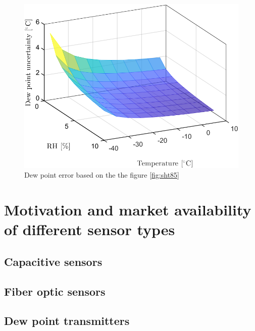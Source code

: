 \begin{figure}[!h]
\centering
\includegraphics[width=0.6\columnwidth]{Chapter6/images/SHTRH15T02.png}
\caption{Dew point error based on the the figure \ref{fig:sht85}}
\label{fig:sht85_dp}
\end{figure}




\section{Motivation and market availability of different sensor types}



\subsection{Capacitive sensors}

\subsection{Fiber optic sensors}

\subsection{Dew point transmitters}

